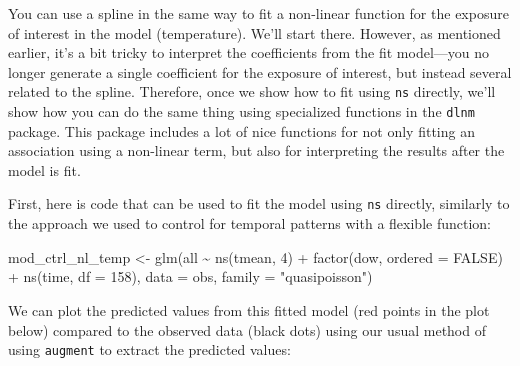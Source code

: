 \documentclass[
]{book}
\newenvironment{Shaded}{\begin{snugshade}}{\end{snugshade}}
\newcommand{\AttributeTok}[1]{\textcolor[rgb]{0.77,0.63,0.00}{#1}}
\newcommand{\ConstantTok}[1]{\textcolor[rgb]{0.00,0.00,0.00}{#1}}
\newcommand{\DecValTok}[1]{\textcolor[rgb]{0.00,0.00,0.81}{#1}}
\newcommand{\FloatTok}[1]{\textcolor[rgb]{0.00,0.00,0.81}{#1}}
\newcommand{\FunctionTok}[1]{\textcolor[rgb]{0.00,0.00,0.00}{#1}}
\newcommand{\NormalTok}[1]{#1}
\newcommand{\OtherTok}[1]{\textcolor[rgb]{0.56,0.35,0.01}{#1}}
\newcommand{\SpecialCharTok}[1]{\textcolor[rgb]{0.00,0.00,0.00}{#1}}
\newcommand{\StringTok}[1]{\textcolor[rgb]{0.31,0.60,0.02}{#1}}
\begin{document}
You can use a spline in the same way to fit a non-linear function for the
exposure of interest in the model (temperature). We'll start there. However,
as mentioned earlier, it's a bit tricky to interpret the coefficients from the
fit model---you no longer generate a single coefficient for the exposure of
interest, but instead several related to the spline. Therefore, once we show
how to fit using \texttt{ns} directly, we'll show how you can do the same thing using
specialized functions in the \texttt{dlnm} package. This package includes a lot of
nice functions for not only fitting an association using a non-linear term,
but also for interpreting the results after the model is fit.

First, here is code that can be used to fit the model using \texttt{ns} directly,
similarly to the approach we used to control for temporal patterns with a
flexible function:

\begin{Shaded}
\begin{Highlighting}[]
\NormalTok{mod\_ctrl\_nl\_temp }\OtherTok{\textless{}{-}} \FunctionTok{glm}\NormalTok{(all }\SpecialCharTok{\textasciitilde{}} \FunctionTok{ns}\NormalTok{(tmean, }\DecValTok{4}\NormalTok{) }\SpecialCharTok{+} \FunctionTok{factor}\NormalTok{(dow, }\AttributeTok{ordered =} \ConstantTok{FALSE}\NormalTok{) }\SpecialCharTok{+}
                          \FunctionTok{ns}\NormalTok{(time, }\AttributeTok{df =} \DecValTok{158}\NormalTok{), }
                        \AttributeTok{data =}\NormalTok{ obs, }\AttributeTok{family =} \StringTok{"quasipoisson"}\NormalTok{)}
\end{Highlighting}
\end{Shaded}

We can plot the predicted values from this fitted model (red points in the plot below)
compared to the observed data (black dots) using our usual method of using \texttt{augment} to
extract the predicted values:

\begin{Shaded}
\end{Shaded}
\end{document}
